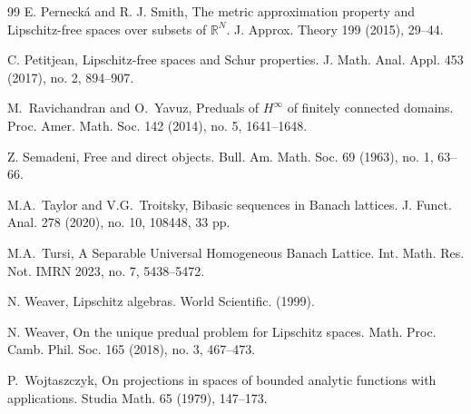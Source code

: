 \documentclass[12pt,leqno]{amsart}
\numberwithin{equation}{section} %
\theoremstyle{definition}
\numberwithin{equation}{section}
\begin{document}
\begin{thebibliography}{99}
 E. Perneck\'a and R. J. Smith, The metric approximation property and Lipschitz-free spaces over subsets of $\mathbb R^N$. J. Approx. Theory 199 (2015), 29--44. 


 C. Petitjean, Lipschitz-free spaces and Schur properties. J. Math. Anal. Appl. 453 (2017), no. 2, 894--907. 

 M.~Ravichandran and O.~Yavuz, Preduals of $H^\infty$ of finitely connected domains.
Proc. Amer. Math. Soc. 142 (2014), no. 5, 1641--1648.

 Z. Semadeni, Free and direct objects. Bull. Am. Math. Soc. 69 (1963), no. 1, 63--66. 

M.A.~Taylor and V.G.~Troitsky, Bibasic sequences in Banach lattices. J. Funct. Anal. 278 (2020), no. 10, 108448, 33 pp.

M.A.~Tursi, A Separable Universal Homogeneous Banach Lattice. Int. Math. Res. Not. IMRN 2023, no. 7, 5438--5472.

N. Weaver, Lipschitz algebras. World Scientific. (1999). 

N. Weaver, On the unique predual problem for Lipschitz spaces. Math. Proc. Camb. Phil. Soc. 165 (2018), no. 3, 467--473.

P.~Wojtaszczyk, On projections in spaces of bounded analytic functions with applications. Studia Math. 65 (1979), 147--173.



\end{thebibliography}
\end{document}
